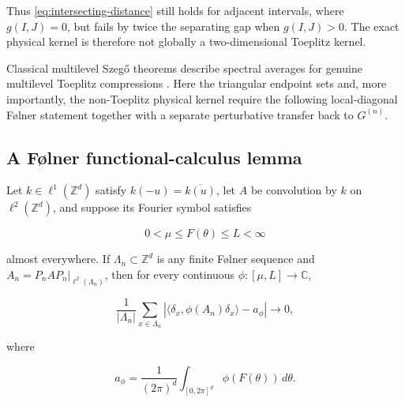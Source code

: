 Thus \eqref{eq:intersecting-distance} still holds for adjacent intervals, where \(g(I,J)=0\), but fails by twice the separating gap when \(g(I,J)>0\). The exact physical kernel is therefore not globally a two-dimensional Toeplitz kernel.

Classical multilevel Szeg{\H o} theorems describe spectral averages for genuine
multilevel Toeplitz compressions \cite{tilli1998,tyrtyshnikov1998}. Here the
triangular endpoint sets and, more importantly, the non-Toeplitz physical
kernel require the following local-diagonal Følner statement together with a
separate perturbative transfer back to \(G^{(n)}\).

\subsection{A Følner functional-calculus lemma}\label{a-folner-functional-calculus-lemma}

\begin{lemma}\label{lem:folner-diagonal}
Let \(k\in\ell^1(\mathbb Z^d)\) satisfy \(k(-u)=\overline{k(u)}\), let \(A\) be convolution by \(k\) on \(\ell^2(\mathbb Z^d)\), and suppose its Fourier symbol satisfies

\[
0<\mu\le F(\theta)\le L<\infty
\]

almost everywhere. If \(\Lambda_n\subset\mathbb Z^d\) is any finite Følner sequence and \(A_n=P_nAP_n|_{\ell^2(\Lambda_n)}\), then for every continuous \(\phi:[\mu,L]\to\mathbb C\),

\begin{equation}\label{eq:folner-diagonal}
\frac1{|\Lambda_n|}\sum_{x\in\Lambda_n}
\left|
\langle\delta_x,\phi(A_n)\delta_x\rangle-a_\phi
\right|\longrightarrow0,
\end{equation}

where

\[
a_\phi=\frac1{(2\pi)^d}\int_{[0,2\pi]^d}\phi(F(\theta))\,d\theta.
\]
\end{lemma}

